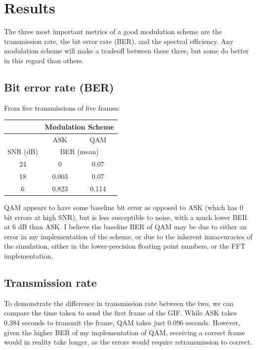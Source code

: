 \documentclass{article}
\begin{document}
\section{Results}
The three most important metrics of a good modulation scheme are the transmission rate, the bit error rate (BER), and the spectral efficiency. Any modulation scheme will make a tradeoff between these three, but some do better in this regard than others. 

\subsection{Bit error rate (BER)}
From five transmissions of five frames:
\begin{center}
    \begin{tabular}{|c|c|c|}
        \hline
                 & \multicolumn{2}{c|}{Modulation Scheme}         \\ \hline
                 & ASK                                    & QAM   \\ \hline
        SNR (dB) & \multicolumn{2}{c|}{BER (mean)}                \\ \hline
        24       & 0                                      & 0.07  \\
        18       & 0.003                                  & 0.07  \\
        6        & 0.823                                  & 0.114 \\ \hline
    \end{tabular}
\end{center}

QAM appears to have some baseline bit error as opposed to ASK (which has 0 bit errors at high SNR), but is less susceptible to noise, with a much lower BER at 6 dB than ASK. I believe the baseline BER of QAM may be due to either an error in my implementation of the scheme, or due to the inherent innaccuracies of the simulation, either in the lower-precision floating point numbers, or the FFT implementation.

\subsection{Transmission rate}
To demonstrate the difference in transmission rate between the two, we can compare the time taken to send the first frame of the GIF. While ASK takes 0.384 seconds to transmit the frame, QAM takes just 0.096 seconds.
However, given the higher BER of my implementation of QAM, receiving a correct frame would in reality take longer, as the errors would require retransmission to correct. 
\end{document}
